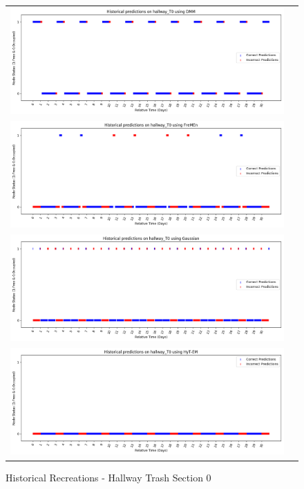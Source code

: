 \begin{center}
\begin{figure}[!Hp]
  \begin{tabular}{cc}
    {\includegraphics[width = 6in]{images/results/Historical_hallway_T0_DMM.png}} \\
    {\includegraphics[width = 6in]{images/results/Historical_hallway_T0_FreMEn.png}} \\
    {\includegraphics[width = 6in]{images/results/Historical_hallway_T0_Gaussian.png}} \\
    {\includegraphics[width = 6in]{images/results/Historical_hallway_T0_HyT-EM.png}} \\
  \end{tabular}
  \caption{Historical Recreations - Hallway Trash Section 0}
\end{figure}


\end{center}
